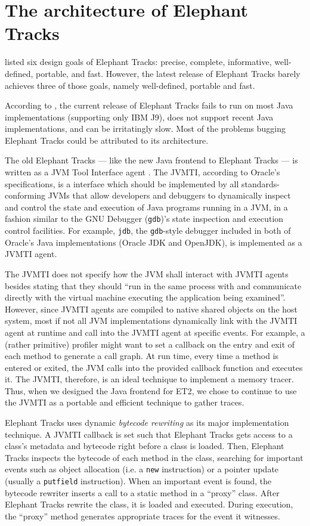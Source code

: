 \section{The architecture of Elephant Tracks}
\cite{ElephantTracks} listed six design goals of Elephant Tracks: precise, complete, informative,
well-defined, portable, and fast. However, the latest release of Elephant Tracks \citep{ElephantTracksPage}
barely achieves three of those goals, namely well-defined, portable and fast.

According to \cite{ElephantTracksPage}, the current release of Elephant Tracks fails to run on most Java
implementations (supporting only IBM J9), does not support recent Java implementations, and can be
irritatingly slow. Most of the problems bugging Elephant Tracks could be attributed to its architecture.

The old Elephant Tracks --- like the new Java frontend to Elephant Tracks --- is written as a JVM Tool Interface
agent \citep{ElephantTracks}. The JVMTI, according to Oracle's specifications, is a interface which should be implemented
by all standards-conforming JVMs that allow developers and debuggers to dynamically inspect and control the state
and execution of Java programs \citep{JVMTI} running in a JVM, in a fashion similar to the GNU Debugger
(\lstinline{gdb})'s state inspection and execution control facilities. For example, \lstinline{jdb}, the
\lstinline{gdb}-style debugger included in both of Oracle's Java implementations (Oracle JDK and OpenJDK), is implemented
as a JVMTI agent.

The JVMTI does not specify how the JVM shall interact with JVMTI agents besides stating that they should ``run in the same
process with and communicate directly with the virtual machine executing the application being examined''. However, since
JVMTI agents are compiled to native shared objects on the host system, most if not all JVM implementations dynamically
link with the JVMTI agent at runtime and call into the JVMTI agent at specific events. For example, a (rather primitive)
profiler might want to set a callback on the entry and exit of each method to generate a call graph. At run time, every time
a method is entered or exited, the JVM calls into the provided callback function and executes it. The JVMTI, therefore, is an
ideal technique to implement a memory tracer. Thus, when we designed the Java frontend for ET2, we chose to continue to use
the JVMTI as a portable and efficient technique to gather traces.

Elephant Tracks uses dynamic \emph{bytecode rewriting} as its major implementation technique. A JVMTI callback is set such that
Elephant Tracks gets access to a class's metadata and bytecode right before a class is loaded. Then, Elephant Tracks inspects
the bytecode of each method in the class, searching for important events such as object allocation (i.e. a \lstinline{new} instruction)
or a pointer update (usually a \lstinline{putfield} instruction). When an important event is found, the bytecode rewriter inserts a
call to a static method in a ``proxy'' class. After Elephant Tracks rewrite the class, it is loaded and executed. During
execution, the ``proxy'' method generates appropriate traces for the event it witnesses.

